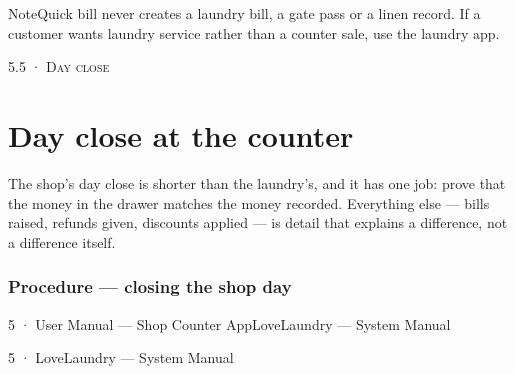 \documentclass[11pt,a4paper,oneside]{book}
\begin{document}
\begin{notebox}NoteQuick bill never creates a laundry bill, a gate pass or a linen record. If a customer wants laundry service rather than a counter sale, use the laundry app.\end{notebox}
\textsc{\small\color{crimson}5.5 · Day close}\par\medskip
\section*{Day close at the counter}
The shop's day close is shorter than the laundry's, and it has one job: prove that the money in the drawer matches the money recorded. Everything else — bills raised, refunds given, discounts applied — is detail that explains a difference, not a difference itself.

\subsubsection*{Procedure — closing the shop day}
5 · User Manual — Shop Counter AppLoveLaundry — System Manual

5 · LoveLaundry — System Manual
\end{document}
